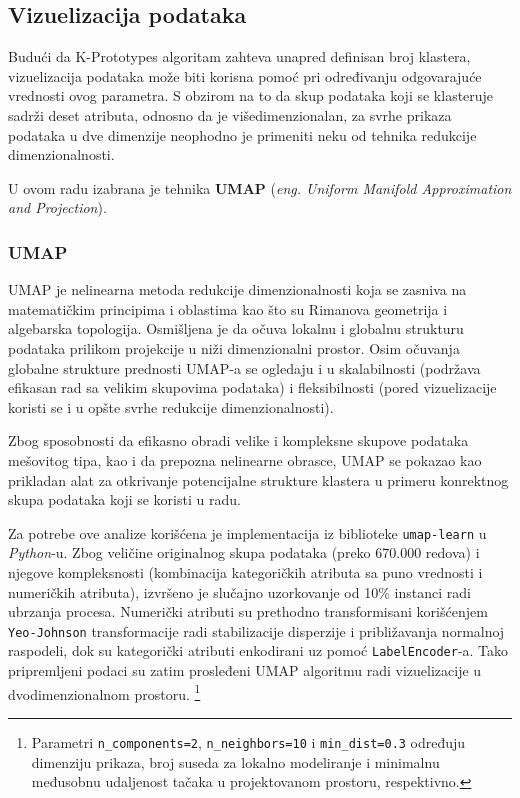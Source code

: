 \documentclass[a4paper,12pt]{article}
\begin{document}
\subsection{Vizuelizacija podataka}
Budući da K-Prototypes algoritam zahteva unapred definisan broj klastera, vizuelizacija podataka može biti korisna pomoć pri određivanju odgovarajuće vrednosti ovog parametra. S obzirom na to da skup podataka koji se klasteruje sadrži deset atributa, odnosno da je višedimenzionalan, za svrhe prikaza podataka u dve dimenzije neophodno je primeniti neku od tehnika redukcije dimenzionalnosti.

U ovom radu izabrana je tehnika \textbf{UMAP} (\textit{eng. Uniform Manifold Approximation and Projection}).
\subsubsection{UMAP}
UMAP je nelinearna metoda redukcije dimenzionalnosti koja se zasniva na matematičkim principima i oblastima kao što su Rimanova geometrija i algebarska topologija. Osmišljena je da očuva lokalnu i globalnu strukturu podataka prilikom projekcije u niži dimenzionalni prostor. Osim očuvanja globalne strukture prednosti UMAP-a se ogledaju i u skalabilnosti (podržava efikasan rad sa velikim skupovima podataka) i fleksibilnosti (pored vizuelizacije koristi se i u opšte svrhe redukcije dimenzionalnosti).

Zbog sposobnosti da efikasno obradi velike i kompleksne skupove podataka mešovitog tipa, kao i da prepozna nelinearne obrasce, UMAP se pokazao kao prikladan alat za otkrivanje potencijalne strukture klastera u primeru konrektnog skupa podataka koji se koristi u radu.

Za potrebe ove analize korišćena je implementacija iz biblioteke \texttt{umap-learn} u \textit{Python}-u. Zbog veličine originalnog skupa podataka (preko 670.000 redova) i njegove kompleksnosti (kombinacija kategoričkih atributa sa puno vrednosti i numeričkih atributa), izvršeno je slučajno uzorkovanje od 10\% instanci radi ubrzanja procesa. Numerički atributi su prethodno transformisani korišćenjem \texttt{Yeo-Johnson} transformacije radi stabilizacije disperzije i približavanja normalnoj raspodeli, dok su kategorički atributi enkodirani uz pomoć \texttt{LabelEncoder}-a. Tako pripremljeni podaci su zatim prosleđeni UMAP algoritmu radi vizuelizacije u dvodimenzionalnom prostoru. \footnote{Parametri \texttt{n\_components=2}, \texttt{n\_neighbors=10} i \texttt{min\_dist=0.3} određuju dimenziju prikaza, broj suseda za lokalno modeliranje i minimalnu međusobnu udaljenost tačaka u projektovanom prostoru, respektivno.}
\end{document}
